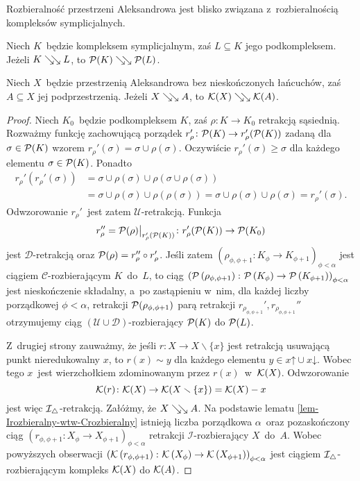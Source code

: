 Rozbieralność przestrzeni Aleksandrowa jest blisko związana z~rozbieralnością kompleksów symplicjalnych.

\begin{lem}\label{lem-rozbieralnosc_tu_i_tu}
Niech $K$~będzie kompleksem symplicjalnym, zaś $L\subseteq K$ jego podkompleksem. Jeżeli $K\searrow\!\!\searrow L$, to $\mathcal{P}(K)\searrow\!\!\searrow \mathcal{P}(L)$. %

Niech $X$~będzie przestrzenią Aleksandrowa bez nieskończonych łańcuchów, zaś $A\subseteq X$ jej podprzestrzenią. Jeżeli $X\searrow\!\!\searrow A$, to $\mathcal{K}(X)\searrow\!\!\searrow \mathcal{K}(A)$.
\end{lem}
\begin{proof}
Niech $K_0$~będzie podkompleksem $K$, zaś $\rho\colon K\to K_0$ retrakcją sąsiednią. Rozważmy funkcję zachowującą porządek $r'_\rho\colon \mathcal{P}(K)\to r_\rho'(\mathcal{P}(K))$ zadaną dla $\sigma\in\mathcal{P}(K)$ wzorem $r_\rho'(\sigma)=\sigma\cup \rho(\sigma)$. Oczywiście $r_\rho'(\sigma)\geq \sigma$ dla każdego elementu $\sigma\in\mathcal{P}(K)$. Ponadto \begin{align*}r_\rho'\left(r_\rho'(\sigma)\right)&=\sigma\cup\rho(\sigma)\cup\rho(\sigma\cup \rho(\sigma))\\&=\sigma\cup\rho(\sigma)\cup\rho(\rho(\sigma))=\sigma\cup\rho(\sigma)\cup\rho(\sigma)=r_\rho'(\sigma).\end{align*} Odwzorowanie $r_\rho'$~jest zatem \mbox{$\mathcal{U}$-retrakcją}. Funkcja \[r_\rho''=\mathcal{P}(\rho)\big|_{r_\rho'(\mathcal{P}(K))}\colon r_\rho'(\mathcal{P}(K))\to \mathcal{P}(K_0)\] jest \mbox{$\mathcal{D}$-retrakcją} oraz $\mathcal{P}(\rho)=r_\rho''\circ r_\rho'$. Jeśli zatem $\left(\rho_{\phi,\phi+1}\colon K_\phi\to K_{\phi+1}\right)_{\phi<\alpha}$ jest ciągiem \mbox{$\mathcal{C}$-rozbierającym} $K$~do~$L$, to ciąg $\left(\mathcal{P}\left(\rho_{\phi,\phi+1}\right)\colon \mathcal{P}\left(K_\phi\right)\to \mathcal{P}\left(K_{\phi+1}\right)\right)_{\phi<\alpha}$ jest nieskończenie składalny, a~po zastąpieniu w~nim, dla każdej liczby porządkowej $\phi<\alpha$, retrakcji $\mathcal{P}\!\left(\rho_{\phi,\phi+1}\right)$ parą retrakcji $r_{\rho_{\phi,\phi+1}}', r_{\rho_{\phi,\phi+1}}''$ otrzymujemy ciąg \mbox{$(\mathcal{U}\cup\mathcal{D})$-rozbierający} $\mathcal{P}(K)$ do $\mathcal{P}(L)$.

Z~drugiej strony zauważmy, że jeśli $r\colon X\to X\smallsetminus\{x\}$ jest retrakcją usuwającą punkt nieredukowalny $x$, to $r(x)\sim y$ dla każdego elementu $y\in x\mathord{\uparrow}\cup x\mathord{\downarrow}$. Wobec tego $x$~jest wierzchołkiem zdominowanym przez $r(x)$~w~$\mathcal{K}(X)$. Odwzorowanie \[\mathcal{K}(r)\colon \mathcal{K}(X)\to \mathcal{K}(X\smallsetminus\{x\})=\mathcal{K}(X)-x\] jest więc $\mathcal{I}_\triangle$-retrakcją. Załóżmy, że $X\searrow\!\!\searrow A$. Na podstawie lematu \ref{lem-Irozbieralny-wtw-Crozbieralny} istnieją liczba porządkowa $\alpha$~oraz pozaskończony ciąg $\left(r_{\phi,\phi+1}\colon X_\phi\to X_{\phi+1}\right)_{\phi<\alpha}$ retrakcji $\mathcal{I}$-rozbierający $X$~do~$A$. Wobec powyższych obserwacji $\left(\mathcal{K}\left(r_{\phi,\phi+1}\right)\colon \mathcal{K}\left(X_\phi\right)\to \mathcal{K}\left(X_{\phi+1}\right)\right)_{\phi<\alpha}$ jest ciągiem $\mathcal{I}_\triangle$-rozbierającym kompleks $\mathcal{K}(X)$ do $\mathcal{K}(A)$.
\end{proof}

